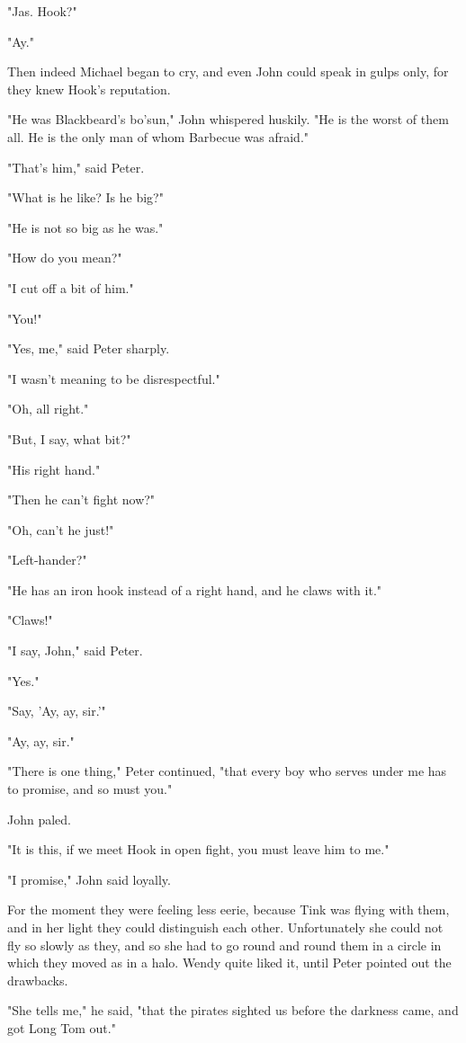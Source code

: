 "Jas. Hook?"


"Ay."


Then indeed Michael began to cry, and even John could speak in gulps only,
for they knew Hook's reputation.


"He was Blackbeard's bo'sun," John whispered huskily. "He is the worst of
them all. He is the only man of whom Barbecue was afraid."


"That's him," said Peter.


"What is he like? Is he big?"


"He is not so big as he was."


"How do you mean?"


"I cut off a bit of him."


"You!"


"Yes, me," said Peter sharply.


"I wasn't meaning to be disrespectful."


"Oh, all right."


"But, I say, what bit?"


"His right hand."


"Then he can't fight now?"


"Oh, can't he just!"


"Left-hander?"


"He has an iron hook instead of a right hand, and he claws with it."


"Claws!"


"I say, John," said Peter.


"Yes."


"Say, 'Ay, ay, sir.'"


"Ay, ay, sir."


"There is one thing," Peter continued, "that every boy who serves under me
has to promise, and so must you."


John paled.


"It is this, if we meet Hook in open fight, you must leave him to me."


"I promise," John said loyally.


For the moment they were feeling less eerie, because Tink was flying with
them, and in her light they could distinguish each other. Unfortunately
she could not fly so slowly as they, and so she had to go round and round
them in a circle in which they moved as in a halo. Wendy quite liked it,
until Peter pointed out the drawbacks.


"She tells me," he said, "that the pirates sighted us before the darkness
came, and got Long Tom out."


